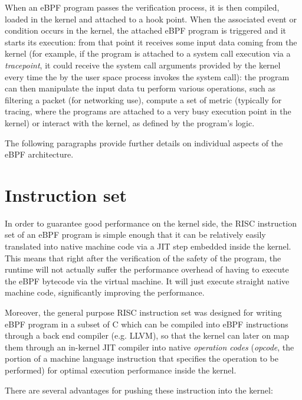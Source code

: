 When an eBPF program passes the verification process, it is then compiled, loaded in the kernel and attached to a hook point.
When the associated event or condition occurs in the kernel, the attached eBPF program is triggered and it starts its execution: from that point it receives some input data coming from the kernel (for example, if the program is attached to a system call execution via a \textit{tracepoint}, it could receive the system call arguments provided by the kernel every time the by the user space process invokes the system call): the program can then manipulate the input data tu perform various operations, such as filtering a packet (for networking use), compute a set of metric (typically for tracing, where the programs are attached to a very busy execution point in the kernel) or interact with the kernel, as defined by the program's logic.

The following paragraphs provide further details on individual aspects of the eBPF architecture.

\section{Instruction set}

In order to guarantee good performance on the kernel side, the RISC instruction set of an eBPF program is simple enough that it can be relatively easily translated into native machine code via a JIT step embedded inside the kernel. 
This means that right after the verification of the safety of the program, the runtime will not actually suffer the performance overhead of having to execute the eBPF bytecode via the virtual machine. 
It will just execute straight native machine code, significantly improving the performance.

Moreover, the general purpose RISC instruction set was designed for writing eBPF program in a subset of C which can be compiled into eBPF instructions through a back end compiler (e.g. LLVM), so that the kernel can later on map them through an in-kernel JIT compiler into native \textit{operation codes} (\textit{opcode}, the portion of a machine language instruction that specifies the operation to be performed) for optimal execution performance inside the kernel.

There are several advantages for pushing these instruction into the kernel:

